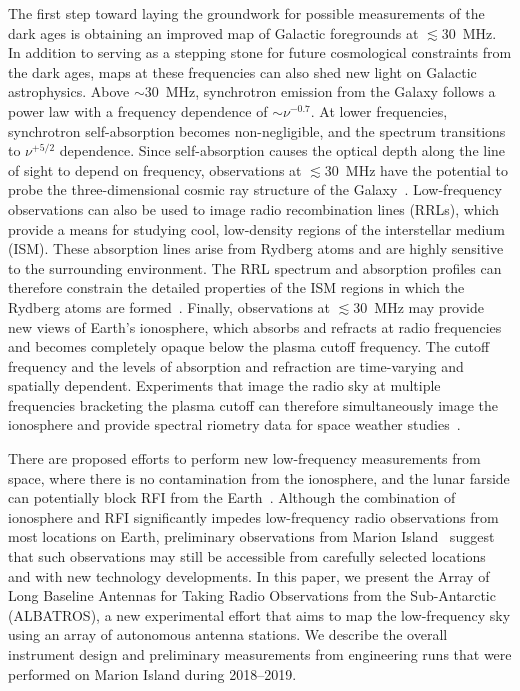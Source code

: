 \documentclass{ws-jai}
\def\albatros{ALBATROS}
\begin{document}
The first step toward laying the groundwork for
possible measurements of the dark ages is obtaining an improved map of
Galactic foregrounds at $\lesssim 30$~MHz.  In addition to serving as
a stepping stone for future cosmological constraints from the dark
ages, maps at these frequencies can also shed new light on Galactic
astrophysics.  Above $\sim30$~MHz, synchrotron emission from the
Galaxy follows a power law with a frequency dependence of $\sim
\nu^{-0.7}$.  At lower frequencies, synchrotron self-absorption
becomes non-negligible, and the spectrum transitions to $\nu^{+5/2}$
dependence.  Since self-absorption causes the optical depth along the
line of sight to depend on frequency, observations at $\lesssim
30$~MHz have the potential to probe the three-dimensional cosmic ray
structure of the Galaxy~\citep{2002ApJ...575..217P}.  Low-frequency
observations can also be used to image radio recombination lines
(RRLs), which provide a means for studying cool, low-density regions
of the interstellar medium (ISM).  These absorption lines arise from
Rydberg atoms and are highly sensitive to the surrounding environment.
The RRL spectrum and absorption profiles can therefore constrain the
detailed properties of the ISM regions in which the Rydberg atoms are
formed~\citep{2009NewAR..53..259G, 2007MNRAS.374..852S}.  Finally,
observations at $\lesssim30$~MHz may provide new views of Earth's
ionosphere, which absorbs and refracts at radio frequencies and
becomes completely opaque below the plasma cutoff frequency.  The
cutoff frequency and the levels of absorption and refraction are
time-varying and spatially dependent.  Experiments that image the
radio sky at multiple frequencies bracketing the plasma cutoff can
therefore simultaneously image the ionosphere and provide spectral
riometry data for space weather studies~\citep{2014GeoRL..41.5370K}.

There are proposed efforts to perform new low-frequency measurements
from space, where there is no contamination from the ionosphere, and
the lunar farside can potentially block RFI from the
Earth~\citep{2019arXiv190710853C, 2019arXiv190804296K}.  Although the
combination of ionosphere and RFI significantly impedes low-frequency
radio observations from most locations on Earth, preliminary
observations from Marion Island~\citep{2019JAI.....850004P} suggest
that such observations may still be accessible from carefully selected
locations and with new technology developments.  In this paper, we
present the Array of Long Baseline Antennas for Taking Radio
Observations from the Sub-Antarctic (\albatros), a new experimental
effort that aims to map the low-frequency sky using an array of
autonomous antenna stations.  We describe the overall instrument
design and preliminary measurements from engineering runs that were
performed on Marion Island during 2018--2019.
\end{document}
